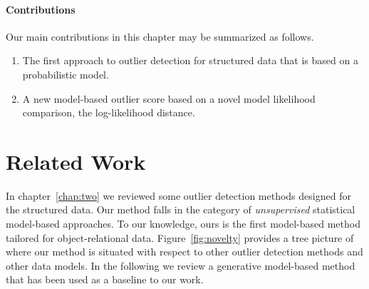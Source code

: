 \paragraph{Contributions} Our main contributions in this chapter may be 
summarized as follows.

\begin{enumerate} 
	\item The first approach to outlier detection for structured data that is based on a probabilistic model. 
	\item A new model-based outlier score based on a novel model likelihood comparison, the log-likelihood distance. 
\end{enumerate}

	\section{Related Work}
	In chapter~\ref{chap:two} we reviewed some outlier detection methods designed for the structured data. Our method falls in the category of {\em unsupervised} statistical model-based approaches. To our knowledge, ours is the first model-based method tailored for object-relational data.
	Figure~\ref{fig:novelty} provides a tree picture of where our method is situated with respect to other outlier detection methods and other data models. In the following we review a generative model-based method that has been used as a baseline to our work.

